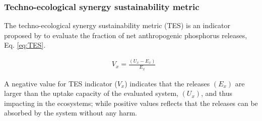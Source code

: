 \documentclass[authoryear]{elsarticle}
\begin{document}
\subsubsection{Techno-ecological synergy sustainability metric}
The techno-ecological synergy sustainability metric (TES) is an indicator proposed by \citet{TESmetric} to evaluate the fraction of net anthropogenic phosphorus releases, Eq. \ref{eq:TES}. 

\begin{align}
& V_{x} =\frac{\left(U_{x} - E_{x}\right)}{E_{x}} \label{eq:TES}
\end{align}

A negative value for TES indicator ($V_{x}$) indicates that the releases $\left(E_{x}\right)$ are larger than the uptake capacity of the evaluated system, $\left(U_{x}\right)$, and thus impacting in the ecosystems; while positive values reflects that the releases can be absorbed by the system without any harm. 
\end{document}
